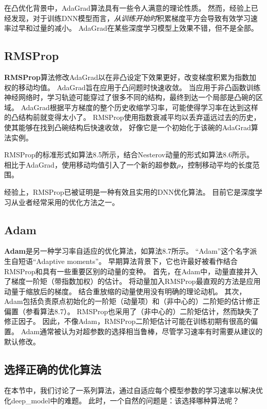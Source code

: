 在凸优化背景中，AdaGrad算法具有一些令人满意的理论性质。
然而，经验上已经发现，对于训练\gls{DNN}模型而言，\emph{从训练开始时}积累梯度平方会导致有效学习速率过早和过量的减小。
AdaGrad在某些深度学习模型上效果不错，但不是全部。

\subsection{RMSProp}
\label{sec:rmsprop}
\textbf{RMSProp}算法\citep{Hinton-ipam2012}修改AdaGrad以在非凸设定下效果更好，改变梯度积累为指数加权的移动均值。
AdaGrad旨在应用于凸问题时快速收敛。
当应用于非凸函数训练神经网络时，学习轨迹可能穿过了很多不同的结构，最终到达一个局部是凸碗的区域。
AdaGrad根据平方梯度的整个历史收缩学习率，可能使得学习率在达到这样的凸结构前就变得太小了。
RMSProp使用指数衰减平均以丢弃遥远过去的历史，使其能够在找到凸碗结构后快速收敛，
好像它是一个初始化于该碗的AdaGrad算法实例。


RMSProp的标准形式如算法8.5所示，结合Nesterov动量的形式如算法8.6所示。
相比于AdaGrad，使用移动均值引入了一个新的超参数$\rho$，控制移动平均的长度范围。


经验上，RMSProp已被证明是一种有效且实用的\gls{DNN}优化算法。
目前它是深度学习从业者经常采用的优化方法之一。

\subsection{Adam}
\label{sec:adam}
\textbf{Adam}\citep{kingma2014adam}是另一种学习率自适应的优化算法，如算法8.7所示。
``Adam''这个名字派生自短语``Adaptive moments''。
早期算法背景下，它也许最好被看作结合RMSProp和具有一些重要区别的动量的变种。
首先，在Adam中，动量直接并入了梯度一阶矩（带指数加权）的估计。
将动量加入RMSProp最直观的方法是应用动量于缩放后的梯度。
结合重放缩的动量使用没有明确的理论动机。
其次，Adam包括负责原点初始化的一阶矩（动量项）和（非中心的）二阶矩的估计修正偏置（参看算法8.7）。
RMSProp也采用了（非中心的）二阶矩估计，然而缺失了修正因子。
因此，不像Adam，RMSProp二阶矩估计可能在训练初期有很高的偏置。
Adam通常被认为对超参数的选择相当鲁棒，尽管学习速率有时需要从建议的默认修改。


\subsection{选择正确的优化算法}
\label{sec:choosing_the_right_optimization_algorithms}
在本节中，我们讨论了一系列算法，通过自适应每个模型参数的学习速率以解决优化\gls{deep_model}中的难题。
此时，一个自然的问题是：该选择哪种算法呢？


